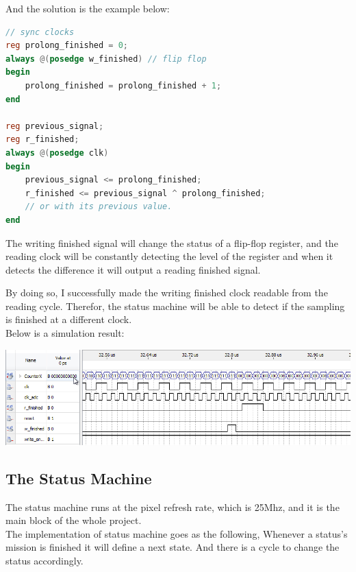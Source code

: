 \documentclass[11pt]{scrartcl}
\begin{document}
And the solution is the example below:
\begin{lstlisting}[language=Verilog]
// sync clocks
reg prolong_finished = 0;
always @(posedge w_finished) // flip flop
begin
	prolong_finished = prolong_finished + 1;
end

reg previous_signal;
reg r_finished;
always @(posedge clk) 
begin
	previous_signal <= prolong_finished; 
	r_finished <= previous_signal ^ prolong_finished;
	// or with its previous value.
end
\end{lstlisting}

The writing finished signal will change the status of a flip-flop register, and the reading clock will be constantly detecting the level of the register and when  it detects the difference it will output a reading finished signal.

By doing so, I successfully made the writing finished clock readable from the reading cycle. Therefor, the status machine will be able to detect if the sampling is finished at a different clock.\\


Below is a simulation result:

\begin{minipage}[t]{\linewidth}

{
\includegraphics[scale = 0.5]{dualram.png}
}
\end{minipage}
\medskip

\subsection{The Status Machine}
\label{sec:status}
The status machine runs at the pixel refresh rate, which is 25Mhz, and it is the main block of the whole project. \\


The implementation of status machine goes as the following, Whenever a status's mission is finished it will define a next state. And there is a cycle to change the status accordingly. 
\end{document}
